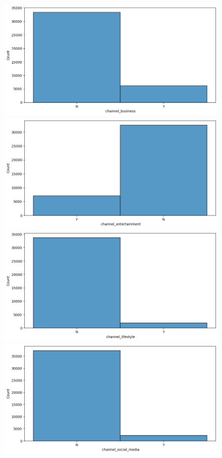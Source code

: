 \documentclass{article}
\begin{document}
\begin{figure}[htb]
    \centering
    \includegraphics[scale=0.33]{news_popularity/analysis/categorical/channel_business.png}
    \includegraphics[scale=0.33]{news_popularity/analysis/categorical/channel_entertainment.png}
    \includegraphics[scale=0.33]{news_popularity/analysis/categorical/channel_lifestyle.png}
    \includegraphics[scale=0.33]{news_popularity/analysis/categorical/channel_social_media.png}

\end{figure}
\end{document}
